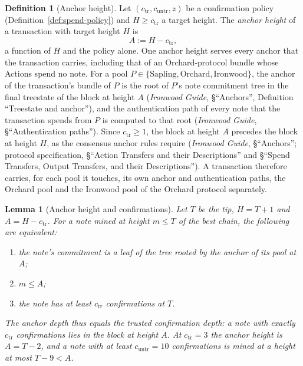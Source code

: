 \documentclass[11pt,a4paper]{article}
\newtheorem{lemma}[theorem]{Lemma}
\theoremstyle{definition}
\newtheorem{definition}[theorem]{Definition}
\begin{document}
\begin{definition}[Anchor height]\label{def:spend-anchor-height}
Let $(c_{\mathrm{tr}}, c_{\mathrm{untr}}, z)$ be a confirmation policy
(Definition~\ref{def:spend-policy}) and $H \ge c_{\mathrm{tr}}$ a target
height. The \emph{anchor height} of a transaction with target height $H$ is
\[
  A := H - c_{\mathrm{tr}},
\]
a function of $H$ and the policy alone. One anchor height serves every
anchor that the transaction carries, including that of an Orchard-protocol
bundle whose Actions spend no note. For a pool $P \in
\{\mathrm{Sapling}, \mathrm{Orchard}, \mathrm{Ironwood}\}$, the anchor of
the transaction's bundle of $P$ is the root of $P$'s note commitment tree in
the final treestate of the block at height $A$ (\emph{Ironwood Guide},
\S``Anchors'', Definition ``Treestate and anchor''), and the authentication path
of every note that the transaction spends from $P$ is computed to that root
(\emph{Ironwood Guide}, \S``Authentication paths''). Since $c_{\mathrm{tr}} \ge
1$, the block at height $A$ precedes the block at height $H$, as the consensus
anchor rules require (\emph{Ironwood Guide}, \S``Anchors''; protocol
specification, \S``Action Transfers and their Descriptions'' and \S``Spend
Transfers, Output Transfers, and their Descriptions''). A transaction therefore
carries, for each pool it touches, its own anchor and authentication paths, the
Orchard pool and the Ironwood pool of the Orchard protocol separately.
\end{definition}

\begin{lemma}[Anchor height and confirmations]\label{lem:spend-anchor}
Let $T$ be the tip, $H = T + 1$ and $A = H - c_{\mathrm{tr}}$. For a note
mined at height $m \le T$ of the best chain, the following are equivalent:
\begin{enumerate}[label=(\roman*)]
\item the note's commitment is a leaf of the tree rooted by the anchor of
  its pool at $A$;
\item $m \le A$;
\item the note has at least $c_{\mathrm{tr}}$ confirmations at $T$.
\end{enumerate}
The anchor depth thus equals the trusted confirmation depth: a note with
exactly $c_{\mathrm{tr}}$ confirmations lies in the block at height $A$. At
$c_{\mathrm{tr}} = 3$ the anchor height is $A = T - 2$, and a note with at
least $c_{\mathrm{untr}} = 10$ confirmations is mined at a height at most
$T - 9 < A$.
\end{lemma}
\end{document}
